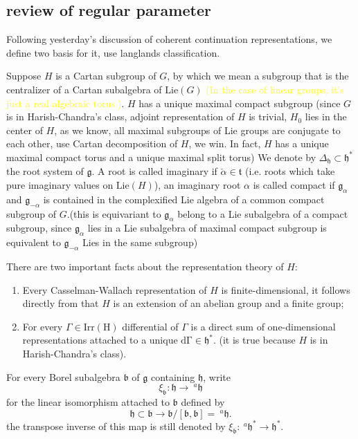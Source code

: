 \documentclass[12pt]{amsart}
\numberwithin{equation}{section}
\newcommand{\fb}{\mathfrak{b}}
\newcommand{\fg}{\mathfrak{g}}
\newcommand{\fh}{\mathfrak{h}}
\newcommand{\ft}{\mathfrak{t}}
\newcommand{\Lie}{{\mathrm{Lie}}}
\begin{document}
\subsection{review of regular parameter}

Following yesterday's discussion of coherent continuation representations, we define two basis
for it, use langlands classification.

Suppose $H$ is a Cartan subgroup of $G$, by which we mean a subgroup that is the centralizer of
a Cartan subalgebra of $\Lie(G)$ \textcolor{yellow}{(In the case of linear groups, it's just a
  real algebraic torus.)}. $H$ has a unique maximal compact subgroup (since $G$ is in Harish-Chandra's
class, adjoint representation of $H$ is trivial, $H_0$ lies in the center of $H$, as we know, all
maximal subgroups of Lie groups are conjugate to each other, use Cartan decomposition of $H$, we win. In fact,
$H$ has a unique maximal compact torus and a unique maximal split torus)
We denote by $\Delta_{\fh} \subset \fh^*$ the root system of $\fg$. A root is called imaginary
if $\check{\alpha } \in \ft$ (i.e. roots which take pure imaginary values on $\Lie(H)$), an imaginary root $\alpha$ is
called compact if $\fg_{\alpha}$ and $\fg_{-\alpha}$ is contained in the complexified Lie algebra of a common compact subgroup of $G$.(this is equivariant to $\fg_\alpha $ belong to a Lie subalgebra of a compact subgroup, since $\fg_\alpha $ lies in a Lie subalgebra of maximal compact subgroup is equivalent to $\fg_{-\alpha }$ Lies in the same subgroup)


There are two important facts about the representation theory of $H$:
\begin{enumerate}
  \item Every Casselman-Wallach representation of $H$ is finite-dimensional, it follows directly from that $H$ is an extension of an abelian group and a finite group;
  \item For every $\Gamma \in \mathrm{Irr(H)}$ differential of $\Gamma$ is a direct sum of one-dimensional representations attached to a unique $\mathrm{d\Gamma \in \fh^*}$.
        (it is true because $H$ is in Harish-Chandra's class).
\end{enumerate}


For every Borel subalgebra $\fb$ of $\fg$ containing $\fh$, write $$\xi_{\fb}: \fh \to \ ^{a}\fh$$
for the linear isomorphism attached to $\fb$ defined by $$\fh \subset \fb \to \fb / [\fb,\fb] = \ ^{a}\fh.$$
the transpose inverse of this map is still denoted by $\xi_{\fb}: \ ^{a}\fh^* \to \fh^*$.\\
\end{document}
